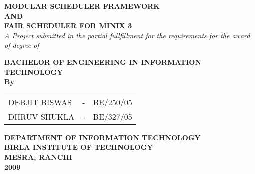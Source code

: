 \begin{titlepage}
  \begingroup
      {\centering
        {\LARGE \bfseries MODULAR SCHEDULER FRAMEWORK \\[0.5\baselineskip]AND\\[0.5\baselineskip]FAIR SCHEDULER FOR MINIX 3}
\\[4\baselineskip]
        {\Large \textit{A Project submitted in the partial fullfillment for the requirements for the award of degree of\\[2\baselineskip]}}
        {\Large \bfseries BACHELOR OF ENGINEERING
          IN 
          INFORMATION TECHNOLOGY \\[1.5\baselineskip]By\\[0.5\baselineskip]
          \begin{tabular}[c]{@{}l l l}
            DEBJIT BISWAS & - & BE/250/05 \\
            
            DHRUV SHUKLA  & - & BE/327/05
          \end{tabular}
        }
        \vfill
        \begin{figure}[ht]
        \centering
        \end{figure}
        {\large \bfseries DEPARTMENT OF INFORMATION TECHNOLOGY\\[1\baselineskip]BIRLA INSTITUTE OF TECHNOLOGY\\
          MESRA, RANCHI\\[1\baselineskip]2009\\}
      }
      \endgroup
\end{titlepage}

